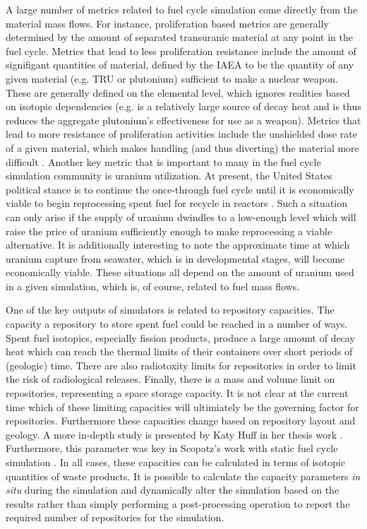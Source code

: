 A large number of metrics related to fuel cycle simulation come directly from
the material mass flows. For instance, proliferation based metrics are generally
determined by the amount of separated transuranic material at any point in the
fuel cycle. Metrics that lead to less proliferation resistance include the
amount of signifigant quantities of material, defined by the IAEA to be the
quantity of any given material (e.g. TRU or plutonium) sufficient to make a
nuclear weapon. These are generally defined on the elemental level, which
ignores realities based on isotopic dependencies (e.g.  is a
relatively large source of decay heat and is thus reduces the aggregate
plutonium's effectiveness for use as a weapon). Metrics that lead to more
resistance of proliferation activities include the unshielded dose rate of a
given material, which makes handling (and thus diverting) the material more
difficult \cite{yacout_vision_2006}. Another key metric that is important to
many in the fuel cycle simulation community is uranium utilization. At present,
the United States political stance is to continue the once-through fuel cycle
until it is economically viable to begin reprocessing spent fuel for recycle in
reactors \cite{hamilton_blue_2012}. Such a situation can only arise if the
supply of uranium dwindles to a low-enough level which will raise the price of
uranium sufficiently enough to make reprocessing a viable alternative. It is
additionally interesting to note the approximate time at which uranium capture
from seawater, which is in developmental stages, will become economically
viable. These situations all depend on the amount of uranium used in a given
simulation, which is, of course, related to fuel mass flows.

One of the key outputs of simulators is related to repository capacities. The
capacity a repository to store spent fuel could be reached in a number of
ways. Spent fuel isotopics, especially fission products, produce a large amount
of decay heat which can reach the thermal limits of their containers over short
periods of (geologic) time. There are also radiotoxity limits for repositories
in order to limit the risk of radiological releases. Finally, there is a mass
and volume limit on repositories, representing a space storage capacity. It is
not clear at the current time which of these limiting capacities will
ultimiately be the governing factor for repositories. Furthermore these
capacities change based on repository layout and geology. A more in-depth study
is presented by Katy Huff in her thesis work
\cite{huff_integrated_2013}. Furthermore, this parameter was key in Scopatz's
work with static fuel cycle simulation \cite{scopatz_essential_2011}. In all
cases, these capacities can be calculated in terms of isotopic quantities of
waste products. It is possible to calculate the capacity parameters \textit{in
  situ} during the simulation and dynamically alter the simulation based on the
results rather than simply performing a post-processing operation to report the
required number of repositories for the simulation. 
